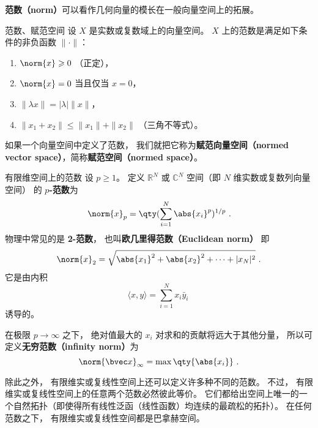 

\textbf{范数（norm）}可以看作几何向量的模长在一般向量空间上的拓展。
\begin{definition}{范数、赋范空间}\label{def_NormV_1}
设 $X$ 是实数或复数域上的向量空间。 $X$ 上的范数是满足如下条件的非负函数 $\|\cdot\|$：
\begin{enumerate}
\item $\norm{x} \geqslant 0$ （正定），
\item $\norm{x} = 0$ 当且仅当 $x = 0$，
\item $\|\lambda x\| = |\lambda|\|x\|$，
\item $\|x_1+x_2\| \leqslant \|x_1\|+ \|x_2\|$ （三角不等式）。
\end{enumerate}
如果一个向量空间中定义了范数， 我们就把它称为\textbf{赋范向量空间（normed vector space）}，简称\textbf{赋范空间（normed space）}。
\end{definition}

\begin{example}{有限维空间上的范数}
设 $p\geq 1$。 定义 $\mathbb R^N$ 或 $\mathbb C^N$ 空间（即 $N$ 维实数或复数列向量空间） 的 \textbf{$p$-范数}为
\begin{equation}
\norm{ x}_p = \qty(\sum_{i=1}^N \abs{x_i}^p)^{1/p}~.
\end{equation}
物理中常见的是 \textbf{2-范数}， 也叫\textbf{欧几里得范数（Euclidean norm）} 即
\begin{equation}
\norm{ x}_2 = \sqrt{\abs{x_1}^2 + \abs{x_2}^2 + \dots+|x_N|^2}~.
\end{equation}
它是由内积
$$
\langle x,y\rangle=\sum_{i=1}^Nx_i\bar y_i~
$$
诱导的。

在极限 $p \to \infty$ 之下， 绝对值最大的 $x_i$ 对求和的贡献将远大于其他分量， 所以可定义\textbf{无穷范数（infinity norm）}为
\begin{equation}
\norm{\bvec x}_\infty = \max \qty{\abs{x_i}}~.
\end{equation}

除此之外， 有限维实或复线性空间上还可以定义许多种不同的范数。 不过， 有限维实或复线性空间上的任意两个范数必然彼此等价。 它们都给出空间上唯一的一个自然拓扑（即使得所有线性泛函（线性函数）均连续的最疏松的拓扑）。 在任何范数之下， 有限维实或复线性空间都是巴拿赫空间。

\end{example}

